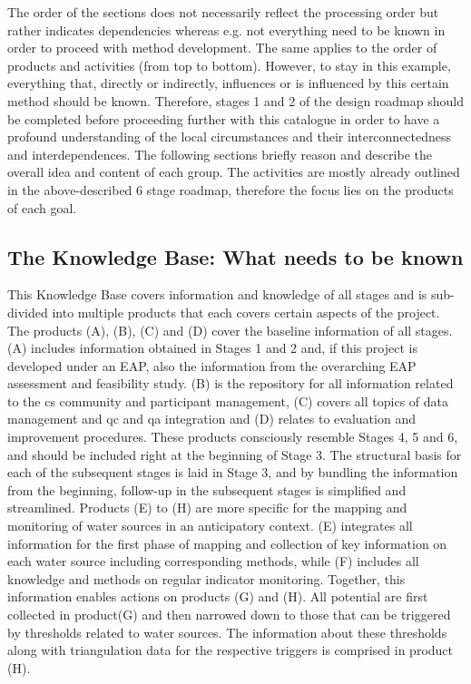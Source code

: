 The order of the sections does not necessarily reflect the processing order but rather indicates dependencies whereas e.g. not everything need to be known in order to proceed with method development. The same applies to the order of products and activities (from top to bottom). However, to stay in this example, everything that, directly or indirectly, influences or is influenced by this certain method should be known. Therefore, stages 1 and 2 of the design roadmap should be completed before proceeding further with this catalogue in order to have a profound understanding of the local circumstances and their interconnectedness and interdependences.\newline
The following sections briefly reason and describe the overall idea and content of each group. The activities are mostly already outlined in the above-described 6 stage roadmap, therefore the focus lies on the products of each goal. 

\subsection{The Knowledge Base: What needs to be known}
This Knowledge Base covers information and knowledge of all stages and is sub-divided into multiple products that each covers certain aspects of the project. 
The products (A), (B), (C) and (D) cover the baseline information of all stages. (A) includes information obtained in Stages 1 and 2 and, if this project is developed under an EAP, also the information from the overarching EAP assessment and feasibility study. (B) is the repository for all information related to the \acrlong{cs} community and participant management, (C) covers all topics of data management and \acrshort{qc} and \acrshort{qa} integration and (D) relates to evaluation and improvement procedures. These products consciously resemble Stages 4, 5 and 6, and should be included right at the beginning of Stage 3. The structural basis for each of the subsequent stages is laid in Stage 3, and by bundling the information from the beginning, follow-up in the subsequent stages is simplified and streamlined.\newline
Products (E) to (H) are more specific for the mapping and monitoring of water sources in an anticipatory context. (E) integrates all information for the first phase of mapping and collection of key information on each water source including corresponding methods, while (F) includes all knowledge and methods on regular indicator monitoring. Together, this information enables actions on products (G) and (H). All potential  are first collected in product(G) and then narrowed down to those that can be triggered by thresholds related to water sources. The information about these thresholds along with triangulation data for the respective triggers is comprised in product (H).

